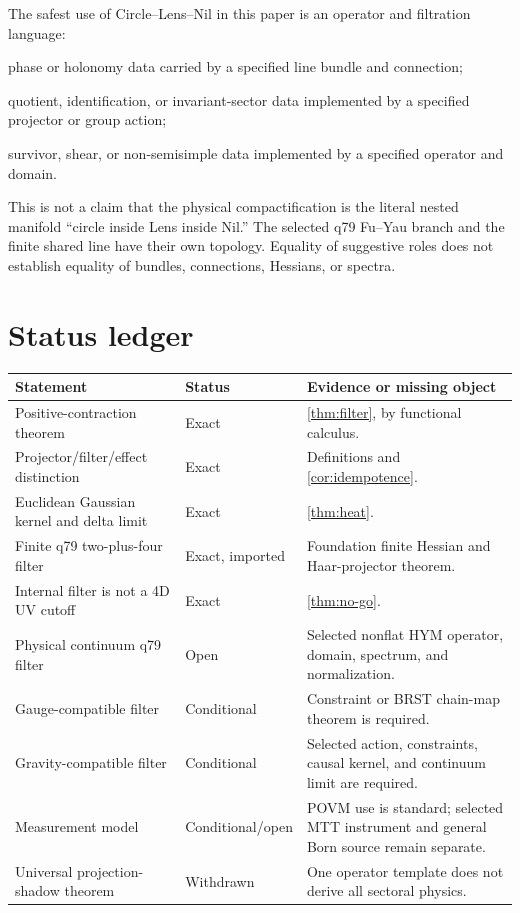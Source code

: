 \documentclass[11pt]{article}
\theoremstyle{definition}
\theoremstyle{remark}
\begin{document}
The safest use of Circle--Lens--Nil in this paper is an operator and
filtration language:
\begin{description}[leftmargin=2.4cm,style=nextline]
\item[Circle] phase or holonomy data carried by a specified line bundle and
connection;
\item[Lens] quotient, identification, or invariant-sector data implemented
by a specified projector or group action;
\item[Nil] survivor, shear, or non-semisimple data implemented by a
specified operator and domain.
\end{description}

This is not a claim that the physical compactification is the literal nested
manifold ``circle inside Lens inside Nil.'' The selected q79 Fu--Yau branch
and the finite shared line have their own topology. Equality of suggestive
roles does not establish equality of bundles, connections, Hessians, or
spectra.

\section{Status ledger}

\begin{center}
\begin{tabularx}{\textwidth}{@{}
>{\raggedright\arraybackslash}p{}
>{\raggedright\arraybackslash}p{}
>{\raggedright\arraybackslash}X@{}}
\toprule
Statement & Status & Evidence or missing object\\
\midrule
Positive-contraction theorem & Exact &
\autoref{thm:filter}, by functional calculus.\\
Projector/filter/effect distinction & Exact &
Definitions and \autoref{cor:idempotence}.\\
Euclidean Gaussian kernel and delta limit & Exact &
\autoref{thm:heat}.\\
Finite q79 two-plus-four filter & Exact, imported &
Foundation finite Hessian and Haar-projector theorem.\\
Internal filter is not a 4D UV cutoff & Exact &
\autoref{thm:no-go}.\\
Physical continuum q79 filter & Open &
Selected nonflat HYM operator, domain, spectrum, and normalization.\\
Gauge-compatible filter & Conditional &
Constraint or BRST chain-map theorem is required.\\
Gravity-compatible filter & Conditional &
Selected action, constraints, causal kernel, and continuum limit are
required.\\
Measurement model & Conditional/open &
POVM use is standard; selected MTT instrument and general Born source remain
separate.\\
Universal projection-shadow theorem & Withdrawn &
One operator template does not derive all sectoral physics.\\
\bottomrule
\end{tabularx}
\end{center}
\end{document}
